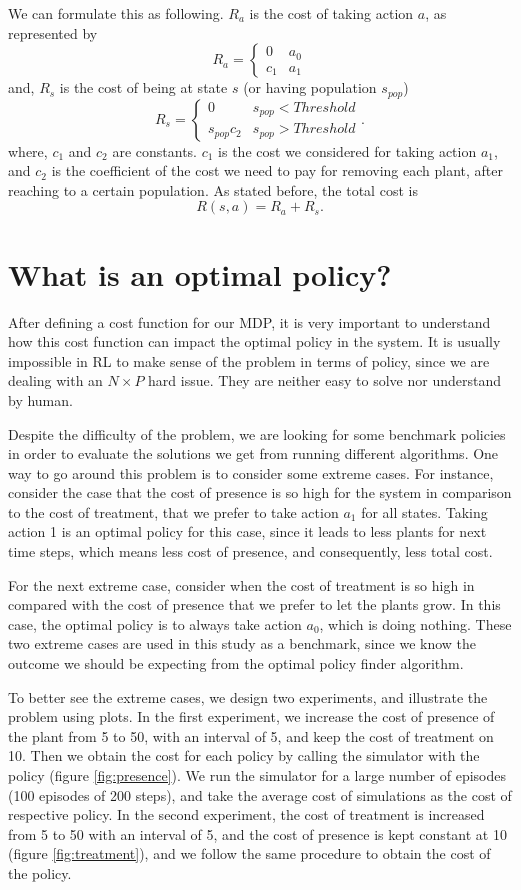 \documentclass{article}
\theoremstyle{remark}
\theoremstyle{remark}
\theoremstyle{remark}
\theoremstyle{remark}
\theoremstyle{remark}
\theoremstyle{remark}
\begin{document}
We can formulate this as following. $R_a$ is the cost of taking action $a$, as represented by
\[
  R_a = \left\{ 
  \begin{array}{lr}
    0 & a_0  \\
    c_1 & a_1
  \end{array}
  \right.
\]
and, $R_s$ is the cost of being at state $s$ (or having population $s_{pop}$)
\[
  R_s = \left\{
  \begin{array}{lr}
    0 & s_{pop} < Threshold \\
    s_{pop} c_2 & s_{pop} > Threshold
  \end{array}
  \right..
\]
where, $c_1$ and $c_2$ are constants. $c_1$ is the cost we considered for taking action $a_1$, and $c_2$ is the coefficient of the cost we need to pay for removing each plant, after reaching to a certain population. As stated before, the total cost is
\[
  R(s,a) = R_a + R_s.
\]

\section*{What is an optimal policy?}
After defining a cost function for our MDP, it is very important to understand how this cost function can impact the optimal policy in the system. It is usually impossible in RL to make sense of the problem in terms of policy, since we are dealing with an $N \times P$ hard issue. They are neither easy to solve nor understand by human.

Despite the difficulty of the problem, we are looking for some benchmark policies in order to evaluate the solutions we get from running different algorithms. One way to go around this problem is to consider some extreme cases. For instance, consider the case that the cost of presence is so high for the system in comparison to the cost of treatment, that we prefer to take action $a_1$ for all states. Taking action 1 is an optimal policy for this case, since it leads to less plants for next time steps, which means less cost of presence, and consequently, less total cost.

For the next extreme case, consider when the cost of treatment is so high in compared with the cost of presence that we prefer to let the plants grow. In this case, the optimal policy is to always take action $a_0$, which is doing nothing. These two extreme cases are used in this study as a benchmark, since we know the outcome we should be expecting from the optimal policy finder algorithm.


To better see the extreme cases, we design two experiments, and illustrate the problem using plots. In the first experiment, we increase the cost of presence of the plant from 5 to 50, with an interval of 5, and keep the cost of treatment on 10. Then we obtain the cost for each policy by calling the simulator with the policy (figure \ref{fig:presence}). We run the simulator for a large number of episodes (100 episodes of 200 steps), and take the average cost of simulations as the cost of respective policy. In the second experiment, the cost of treatment is increased from 5 to 50 with an interval of 5, and the cost of presence is kept constant at 10 (figure \ref{fig:treatment}), and we follow the same procedure to obtain the cost of the policy.
\end{document}
